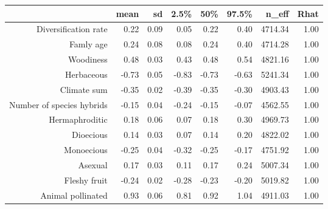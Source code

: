 \begin{table}[ht]
\centering
\begin{tabular}{rrrrrrrr}
  \hline
 & mean & sd & 2.5\% & 50\% & 97.5\% & n\_eff & Rhat \\ 
  \hline
Diversification rate & 0.22 & 0.09 & 0.05 & 0.22 & 0.40 & 4714.34 & 1.00 \\ 
  Famly age & 0.24 & 0.08 & 0.08 & 0.24 & 0.40 & 4714.28 & 1.00 \\ 
  Woodiness & 0.48 & 0.03 & 0.43 & 0.48 & 0.54 & 4821.16 & 1.00 \\ 
  Herbaceous & -0.73 & 0.05 & -0.83 & -0.73 & -0.63 & 5241.34 & 1.00 \\ 
  Climate sum & -0.35 & 0.02 & -0.39 & -0.35 & -0.30 & 4903.43 & 1.00 \\ 
  Number of species hybrids & -0.15 & 0.04 & -0.24 & -0.15 & -0.07 & 4562.55 & 1.00 \\ 
  Hermaphroditic & 0.18 & 0.06 & 0.07 & 0.18 & 0.30 & 4969.73 & 1.00 \\ 
  Dioecious & 0.14 & 0.03 & 0.07 & 0.14 & 0.20 & 4822.02 & 1.00 \\ 
  Monoecious & -0.25 & 0.04 & -0.32 & -0.25 & -0.17 & 4751.92 & 1.00 \\ 
  Asexual & 0.17 & 0.03 & 0.11 & 0.17 & 0.24 & 5007.34 & 1.00 \\ 
  Fleshy fruit & -0.24 & 0.02 & -0.28 & -0.23 & -0.20 & 5019.82 & 1.00 \\ 
  Animal pollinated & 0.93 & 0.06 & 0.81 & 0.92 & 1.04 & 4911.03 & 1.00 \\ 
   \hline
\end{tabular}
\end{table}
